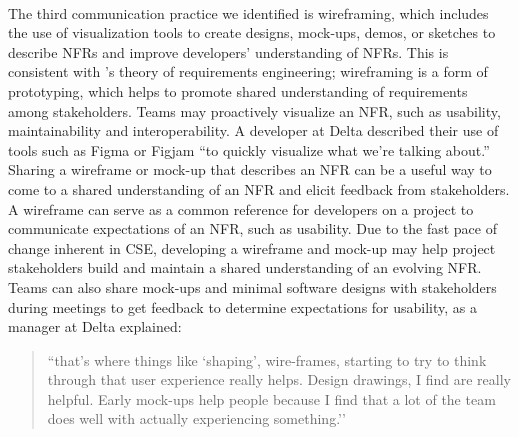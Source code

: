 \documentclass[smallextended]{svjour3}        %
\providecommand{\DIFaddtex}[1]{{\protect\color{blue}\uwave{#1}}} %
\providecommand{\DIFaddbegin}{} %
\providecommand{\DIFaddend}{} %
\providecommand{\DIFadd}[1]{\texorpdfstring{\DIFaddtex{#1}}{#1}} %
\newcommand{\DIFaddincludegraphics}[2][]{{\color{blue}\fbox{\DIFOincludegraphics[#1]{#2}}}} %
\DeclareRobustCommand{\DIFaddbegin}{\DIFOaddbegin \let\includegraphics\DIFaddincludegraphics} %
\DeclareRobustCommand{\DIFaddend}{\DIFOaddend \let\includegraphics\DIFOincludegraphics} %
\begin{document}
\DIFaddbegin \paragraph{\DIFadd{Wireframing}} \DIFaddend The third communication practice we identified is wireframing, which includes the use of visualization tools to create designs, mock-ups, demos, or sketches to describe NFRs and improve developers' understanding of NFRs.
This is consistent with \citet{wagner2019status}'s theory of requirements engineering; wireframing is a form of prototyping, which helps to promote shared understanding of requirements among stakeholders.
Teams may proactively visualize an NFR, such as usability, maintainability and interoperability. A developer at Delta described their use of tools such as Figma or Figjam \textmd{``to quickly visualize what we're talking about.''}
Sharing a wireframe or mock-up that describes an NFR can be a useful way to come to a shared understanding of an NFR and elicit feedback from stakeholders. A wireframe can serve as a common reference for developers on a project to communicate expectations of an NFR, such as usability. Due to the fast pace of change inherent in CSE, 
developing a wireframe and mock-up may help project stakeholders build and maintain a shared understanding of an evolving NFR.
Teams can also share mock-ups and minimal software designs with stakeholders during meetings to get feedback to determine expectations for usability, as a manager at Delta explained:
\begin{quote}
    ``that’s where things like `shaping’, wire-frames, starting to try to think through that user experience really helps. Design drawings, I find are really helpful. Early mock-ups help people because I find that a lot of the team does well with actually experiencing something.''    
\end{quote}    
\end{document}
